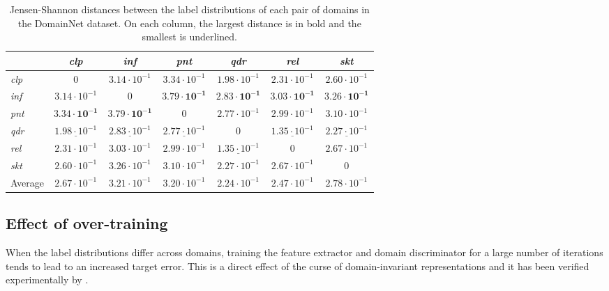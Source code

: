 \begin{table}
	\centering
	\small
	\hspace*{-0.50in}
	\begin{tabular}{l|cccccc}
		& \textit{clp}                & \textit{inf}              & \textit{pnt} & \textit{qdr} & \textit{rel} & \textit{skt} \\ \hline
		\textit{clp} & $0$ & $3.14 \cdot 10^{-1}$ & $3.34 \cdot 10^{-1}$     & $1.98 \cdot 10^{-1}$ & $2.31 \cdot 10^{-1}$ & $2.60 \cdot 10^{-1}$         \\
		\textit{inf} & $3.14 \cdot 10^{-1}$ & $0$ & $\boldsymbol{3.79 \cdot 10^{-1}}$ & $\boldsymbol{2.83 \cdot 10^{-1}}$ & $\boldsymbol{3.03 \cdot 10^{-1}}$ & $\boldsymbol{3.26 \cdot 10^{-1}}$ \\
		\textit{pnt} & $\boldsymbol{3.34 \cdot 10^{-1}}$ & $\boldsymbol{3.79 \cdot 10^{-1}}$ & $0$ & $2.77 \cdot 10^{-1}$ & $2.99 \cdot 10^{-1}$ & $3.10 \cdot 10^{-1}$ \\
		\textit{qdr} & $\underline{1.98 \cdot 10^{-1}}$ & $\underline{2.83 \cdot 10^{-1}}$ & $\underline{2.77 \cdot 10^{-1}}$ & $0$ & $\underline{1.35 \cdot 10^{-1}}$ & $\underline{2.27 \cdot 10^{-1}}$ \\
		\textit{rel}  & $2.31 \cdot 10^{-1}$ & $3.03 \cdot 10^{-1}$ & $2.99 \cdot 10^{-1}$ & $\underline{1.35 \cdot 10^{-1}}$ & $0$ & $2.67 \cdot 10^{-1}$ \\
		\textit{skt}  & $2.60 \cdot 10^{-1}$ & $3.26 \cdot 10^{-1}$ & $3.10 \cdot 10^{-1}$ & $2.27 \cdot 10^{-1}$ & $2.67 \cdot 10^{-1}$ & $0$ \\ \hline
		Average & $2.67 \cdot 10^{-1}$ & $3.21 \cdot 10^{-1}$ & $3.20 \cdot 10^{-1}$ & $2.24 \cdot 10^{-1}$ & $2.47 \cdot 10^{-1}$ & $2.78 \cdot 10^{-1}$ \\
	\end{tabular}
	\caption{Jensen-Shannon distances between the label distributions of each pair of domains in the DomainNet dataset. On each column, the largest distance is in bold and the smallest is underlined.}
	\label{tab:domainnet_js}
\end{table}

\subsection{Effect of over-training}
\label{sec:overtrain}
When the label distributions differ across domains, training the feature extractor and domain discriminator for a large number of iterations tends to lead to an increased target error. This is a direct effect of the curse of domain-invariant representations and it has been verified experimentally by \citet{Zhao2019}.

